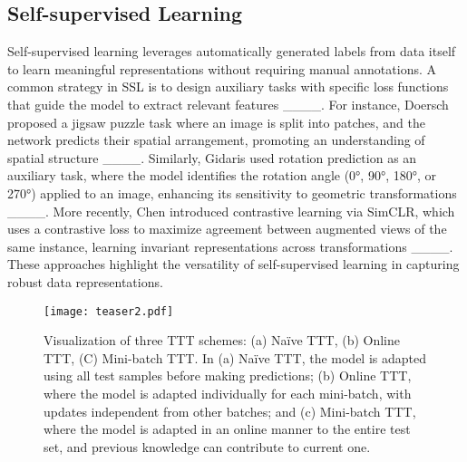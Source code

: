 \subsection{Self-supervised Learning}
Self-supervised learning leverages automatically generated labels from data itself to learn meaningful representations without requiring manual annotations. A common strategy in SSL is to design auxiliary tasks with specific loss functions that guide the model to extract relevant features ____. For instance, Doersch proposed a jigsaw puzzle task where an image is split into patches, and the network predicts their spatial arrangement, promoting an understanding of spatial structure ____. Similarly, Gidaris used rotation prediction as an auxiliary task, where the model identifies the rotation angle (0°, 90°, 180°, or 270°) applied to an image, enhancing its sensitivity to geometric transformations ____. More recently, Chen introduced contrastive learning via SimCLR, which uses a contrastive loss to maximize agreement between augmented views of the same instance, learning invariant representations across transformations ____. These approaches highlight the versatility of self-supervised learning in capturing robust data representations. 

\begin{figure*}
    \centering
    \texttt{[image: teaser2.pdf]}
    \caption{Visualization of three TTT schemes: (a) Naïve TTT, (b) Online TTT, (C) Mini-batch TTT. In (a) Naïve TTT, the model is adapted using all test samples before making predictions; (b) Online TTT, where the model is adapted individually for each mini-batch, with updates independent from other batches; and (c) Mini-batch TTT, where the model is adapted in an online manner to the entire test set, and previous knowledge can contribute to current one. }
    \label{fig:teaser2}
\end{figure*}